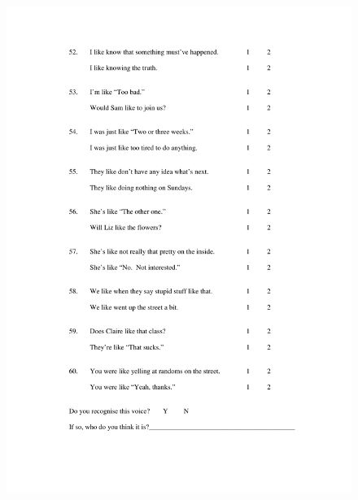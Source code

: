 \begin{figure}
	\centering
		\includegraphics[width=5in]{images/Exp2page7.pdf}
			\label{x2p7}
\end{figure}




